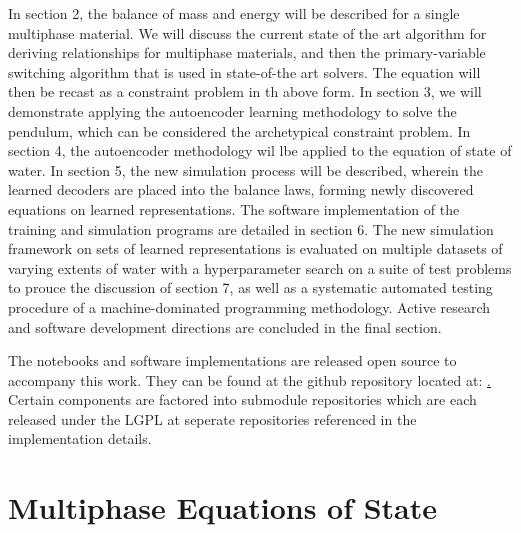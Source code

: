 \documentclass[]{article}
\begin{document}
In section 2, the balance of mass and energy will be described for a
single multiphase material. We will discuss the current state of the
art algorithm for deriving relationships for multiphase materials, and
then the primary-variable switching algorithm that is used in
state-of-the art solvers. The equation will then be recast as a
constraint problem in th above form.
In section 3, we will demonstrate applying the autoencoder learning
methodology to solve the pendulum,
which can be considered the archetypical constraint problem.
In section 4, the autoencoder methodology wil lbe applied to the
equation of state of water. In section 5, the new simulation process
will be described, wherein the learned decoders are placed into the
balance laws, forming newly discovered equations on learned
representations. The software implementation of the training and
simulation programs are detailed in section 6. The new simulation
framework on sets of learned representations is evaluated on
multiple datasets of varying extents of water with a
hyperparameter search on a suite of test problems to prouce the discussion of section 7, as
well as a systematic automated testing procedure of a
machine-dominated programming methodology.
Active research and software development directions are
concluded in the final section.

The notebooks and software implementations are released open source to
accompany this work. They can be found at the github repository
located at: \href{https://github.com/afqueiruga/latentsim}.
Certain components are factored into submodule repositories which are
each released under the LGPL at seperate repositories referenced in
the implementation details.

\section{Multiphase Equations of State}

\end{document}
